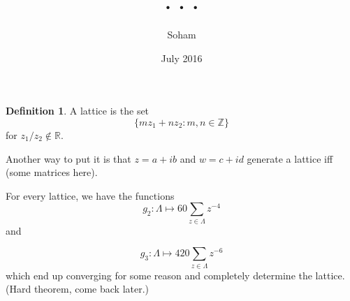 \documentclass{article}
\title{. . .}
\author{Soham}
\date{July 2016}
\newcommand{\Z}{\mathbb Z}
\newcommand{\R}{\mathbb R}
\theoremstyle{definition}
\newtheorem*{defn}{Definition}
\begin{document}
\maketitle
 
\begin{defn}
  A lattice is the set
  $$\{mz_1+nz_2 : m, n\in\Z\}$$
  for $z_1/z_2\not\in\R$.
\end{defn}

Another way to put it is that $z = a+ib$ and $w=c+id$ generate a lattice iff
(some matrices here).

For every lattice, we have the functions 
$$g_2: \Lambda \mapsto 60\sum_{z\in\Lambda} z^{-4}$$
and

$$g_3: \Lambda \mapsto 420\sum_{z\in\Lambda} z^{-6}$$
which end up converging for some reason and completely determine the lattice.
(Hard theorem, come back later.)
\end{document}

